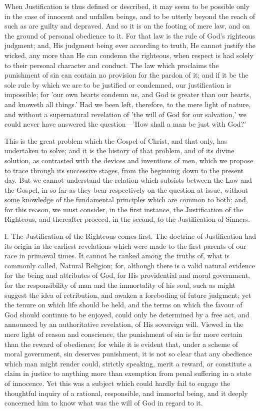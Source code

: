 \documentclass[
]{book}
\begin{document}
When Justification is thus defined or described, it may seem to be possible only in the case of innocent and unfallen beings, and to be utterly beyond the reach of such as are guilty and depraved. And so it is on the footing of mere law, and on the ground of personal obedience to it. For that law is the rule of God's righteous judgment; and, His judgment being ever according to truth, He cannot justify the wicked, any more than He can condemn the righteous, when respect is had solely to their personal character and conduct. The law which proclaims the punishment of sin can contain no provision for the pardon of it; and if it be the sole rule by which we are to be justified or condemned, our justification is impossible; for 'our own hearts condemn us, and God is greater than our hearts, and knoweth all things.' Had we been left, therefore, to the mere light of nature, and without a supernatural revelation of 'the will of God for our salvation,' we could never have answered the question---'How shall a man be just with God?'

This is the great problem which the Gospel of Christ, and that only, has undertaken to solve; and it is the history of that problem, and of its divine solution, as contrasted with the devices and inventions of men, which we propose to trace through its successive stages, from the beginning down to the present day. But we cannot understand the relation which subsists between the Law and the Gospel, in so far as they bear respectively on the question at issue, without some knowledge of the fundamental principles which are common to both; and, for this reason, we must consider, in the first instance, the Justification of the Righteous, and thereafter proceed, in the second, to the Justification of Sinners.

I. The Justification of the Righteous comes first. The doctrine of Justification had its origin in the earliest revelations which were made to the first parents of our race in primæval times. It cannot be ranked among the truths of, what is commonly called, Natural Religion; for, although there is a valid natural evidence for the being and attributes of God, for His providential and moral government, for the responsibility of man and the immortality of his soul, such as might suggest the idea of retribution, and awaken a foreboding of future judgment; yet the tenure on which life should be held, and the terms on which the favour of God should continue to be enjoyed, could only be determined by a free act, and announced by an authoritative revelation, of His sovereign will. Viewed in the mere light of reason and conscience, the punishment of sin is far more certain than the reward of obedience; for while it is evident that, under a scheme of moral government, sin deserves punishment, it is not so clear that any obedience which man might render could, strictly speaking, merit a reward, or constitute a claim in justice to anything more than exemption from penal suffering in a state of innocence. Yet this was a subject which could hardly fail to engage the thoughtful inquiry of a rational, responsible, and immortal being, and it deeply concerned him to know what was the will of God in regard to it.
\end{document}
